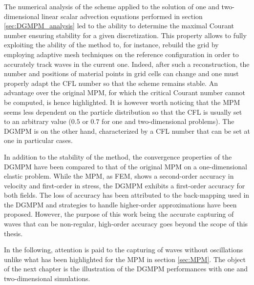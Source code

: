 The numerical analysis of the scheme applied to the solution of one and two-dimensional linear scalar advection equations performed in section \ref{sec:DGMPM_analysis} led to the ability to determine the maximal Courant number ensuring stability for a given discretization.
This property allows to fully exploiting the ability of the method to, for instance, rebuild the grid by employing adaptive mesh techniques on the reference configuration in order to accurately track waves in the current one.
Indeed, after such a reconstruction, the number and positions of material points in grid cells can change and one must properly adapt the CFL number so that the scheme remains stable.
An advantage over the original MPM, for which the critical Courant number cannot be computed, is hence highlighted.
It is however worth noticing that the MPM seems less dependent on the particle distribution so that the CFL is usually set to an arbitrary value ($0.5$ or $0.7$ for one and two-dimensional problems).
The DGMPM is on the other hand, characterized by a CFL number that can be set at one in particular cases.

In addition to the stability of the method, the convergence properties of the DGMPM have been compared to that of the original MPM on a one-dimensional elastic problem. 
While the MPM, as FEM, shows a second-order accuracy in velocity and first-order in stress, the DGMPM exhibits a first-order accuracy for both fields. 
The loss of accuracy has been attributed to the back-mapping used in the DGMPM and strategies to handle higher-order approximations have been proposed. 
However, the purpose of this work being the accurate capturing of waves that can be non-regular, high-order accuracy goes beyond the scope of this thesis.%

In the following, attention is paid to the capturing of waves without oscillations unlike what has been highlighted for the MPM in section \ref{sec:MPM}. 
The object of the next chapter is the illustration of the DGMPM performances with one and two-dimensional simulations.




